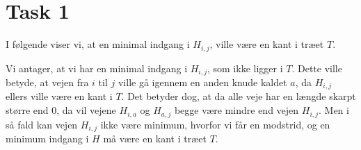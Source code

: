 \section{Task 1}
I følgende viser vi, at en minimal indgang i $H_{i,j}$, ville være en kant i træet $T$.

Vi antager, at vi har en minimal indgang i $H_{i,j}$, som ikke ligger i $T$.
Dette ville betyde, at vejen fra $i$ til $j$ ville gå igennem en anden knude kaldet $a$, da $H_{i,j}$ ellers ville være en kant i $T$.
Det betyder dog, at da alle veje har en længde skarpt større end $0$, da vil vejene $H_{i,a}$ og $H_{a,j}$ begge være mindre end vejen $H_{i,j}$. Men i så fald kan vejen $H_{i,j}$ ikke være minimum, hvorfor vi får en modstrid, og en minimum indgang i $H$ må være en kant i træet $T$. 
